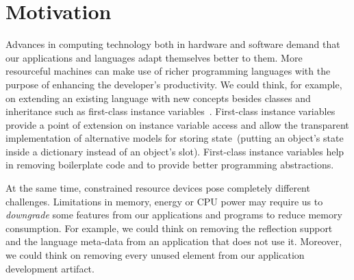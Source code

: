 


\section{Motivation}

Advances in computing technology both in hardware and software demand that our applications and languages adapt themselves better to them. More resourceful machines can make use of richer programming languages with the purpose of enhancing the developer's productivity. We could think, for example, on extending an existing language with new concepts besides classes and inheritance such as first-class instance variables~\cite{Verw11a}. First-class instance variables provide a point of extension on instance variable access and allow the transparent implementation of alternative models for storing state~(\eg putting an object's state inside a dictionary instead of an object's slot). First-class instance variables help in removing boilerplate code and to provide better programming abstractions.

At the same time, constrained resource devices pose completely different challenges. Limitations in memory, energy or CPU power may require us to \emph{downgrade} some features from our applications and programs to reduce memory consumption. For example, we could think on removing the reflection support and the language meta-data from an application that does not use it. Moreover, we could think on removing every unused element from our application development artifact.

